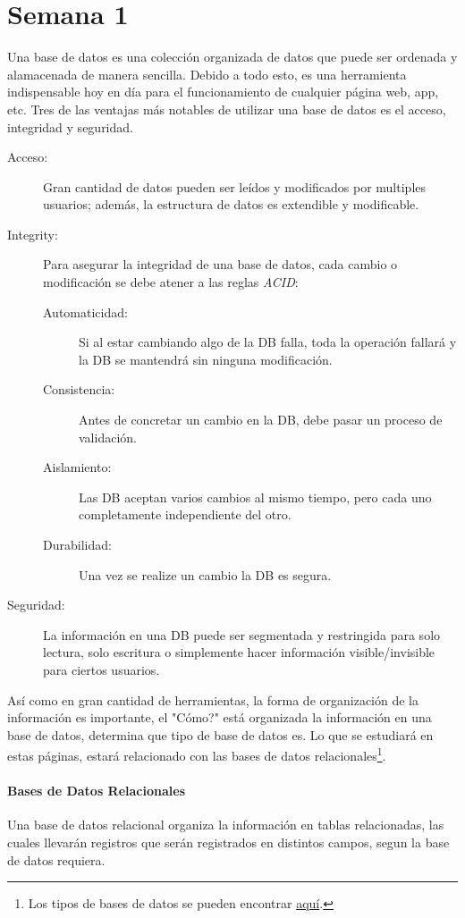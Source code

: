 \section{Semana 1}

Una base de datos es una colección organizada de datos que puede ser ordenada y alamacenada de manera sencilla. Debido a todo esto, es una herramienta indispensable hoy en día para el funcionamiento de cualquier página web, app, etc. Tres de las ventajas más notables de utilizar una base de datos es el acceso, integridad y seguridad.

\begin{description}
	\item[Acceso: ] Gran cantidad de datos pueden ser leídos y modificados por multiples usuarios; además, la estructura de datos es extendible y modificable.
	\item[Integrity: ] Para asegurar la integridad de una base de datos, cada cambio o modificación se debe atener a las reglas \textit{ACID}:
	\begin{description}
		\item[Automaticidad: ] Si al estar cambiando algo de la DB falla, toda la operación fallará y la DB se mantendrá sin ninguna modificación.
		\item[Consistencia: ] Antes de concretar un cambio en la DB, debe pasar un proceso de validación.
		\item[Aislamiento: ] Las DB aceptan varios cambios al mismo tiempo, pero cada uno completamente independiente del otro.
		\item[Durabilidad: ] Una vez se realize un cambio la DB es segura.
	\end{description}
	\item[Seguridad: ] La información en una DB puede ser segmentada y restringida para solo lectura, solo escritura o simplemente hacer información visible/invisible para ciertos usuarios.
\end{description}

Así como en gran cantidad de herramientas, la forma de organización de la información es importante, el "Cómo?" está organizada la información en una base de datos, determina que tipo de base de datos es. Lo que se estudiará en estas páginas, estará relacionado con las bases de datos relacionales\footnote{Los tipos de bases de datos se pueden encontrar \href{https://www.tutorialspoint.com/Types-of-databases}{aquí}.}.

\paragraph{Bases de Datos Relacionales}

Una base de datos relacional organiza la información en tablas relacionadas, las cuales llevarán registros que serán registrados en distintos campos, segun la base de datos requiera.

